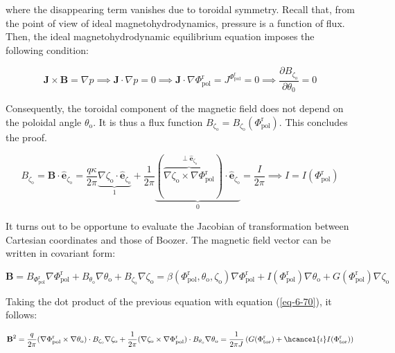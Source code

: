 where the disappearing term vanishes due to toroidal symmetry. Recall that, from the point of view of ideal magnetohydrodynamics, pressure is a function of flux. Then, the ideal magnetohydrodynamic equilibrium equation imposes the following condition:

\begin{equation}
    \mathbf{J}\times\mathbf{B}=\nabla p\implies\mathbf{J}\cdot\nabla p=0\implies\mathbf{J}\cdot\nabla\Phi_\text{pol}^\text{r}=J^{\Phi_\text{pol}^\text{r}}=0\implies\frac{\partial B_{\zeta_\text{o}}}{\partial\theta_0}=0
\end{equation}

Consequently, the toroidal component of the magnetic field does not depend on the poloidal angle $\theta_\text{o}$. It is thus a flux function $B_{\zeta_\text{o}}=B_{\zeta_\text{o}}(\Phi_\text{pol}^\text{r})$. This concludes the proof.

\begin{equation}
    B_{\zeta_\text{o}}=\mathbf{B}\cdot\mathbf{\hat{e}}_{\zeta_\text{o}}=\frac{q\kappa}{2\pi}\underbrace{\nabla\zeta_\text{o}\cdot\mathbf{\hat{e}}_{\zeta_\text{o}}}_1+\frac{1}{2\pi}\underbrace{(\overbrace{\nabla\zeta_\text{o}\times\nabla\Phi_\text{pol}^\text{r}}^{\perp\mathbf{\hat{e}}_{\zeta_\text{o}}})\cdot\mathbf{\hat{e}}_{\zeta_\text{o}}}_0=\frac{I}{2\pi}\implies I=I(\Phi_\text{pol}^\text{r})
\end{equation}

It turns out to be opportune to evaluate the Jacobian of transformation between Cartesian coordinates and those of Boozer. The magnetic field vector can be written in covariant form:

\begin{equation}
    \label{eq-6-77}
    \mathbf{B}=B_{\Phi_\text{pol}^\text{r}}\nabla\Phi_\text{pol}^\text{r}+B_{\theta_\text{o}}\nabla\theta_\text{o}+B_{\zeta_\text{o}}\nabla\zeta_\text{o}=\beta(\Phi_\text{pol}^\text{r}, \theta_\text{o}, \zeta_\text{o})\nabla\Phi_\text{pol}^\text{r}+I(\Phi_\text{pol}^\text{r})\nabla\theta_\text{o}+G(\Phi_\text{pol}^\text{r})\nabla\zeta_\text{o}
\end{equation}

Taking the dot product of the previous equation with equation (\ref{eq-6-70}), it follows:

\begin{equation}
    \mathbf{B}^2=\frac{q}{2\pi}(\nabla\Phi_\text{pol}^\text{r}\times\nabla\theta_\text{o})\cdot B_{\zeta_\text{o}}\nabla\zeta_\text{o}+\frac{1}{2\pi}(\nabla\zeta_\text{o}\times\nabla\Phi_\text{pol}^\text{r})\cdot B_{\theta_\text{o}}\nabla\theta_\text{o}=\frac{1}{2\pi J}\left(G(\Phi_\text{tor}^\text{r})+\hcancel{\iota}I(\Phi_\text{tor}^\text{r})\right)
\end{equation}

